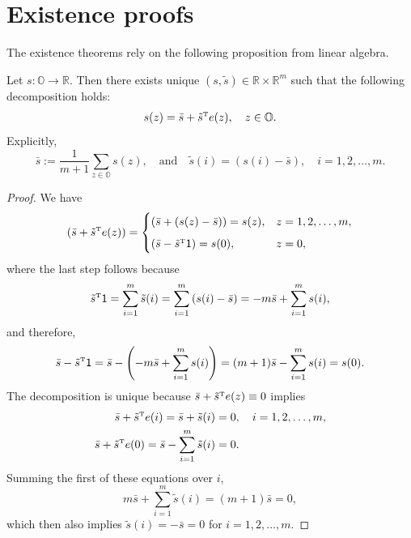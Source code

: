 \documentclass[twoside,11pt]{article}
\def\Re{\mathbb{R}}
\newcommand{\field}[1]{\mathbb{#1}}
\def\Re{\field{R}}
\def\Re{\mathbb{R}}
\renewcommand{\Re}{\mathbb{R}}
\def\bO{\mathbb{O}}
\def\ones{{\sf 1}}
\def\tp{{\hbox{\rm\tiny T}}}
\begin{document}
\appendix



\section{Existence proofs}
\label{appdx:existence}

The existence theorems rely on the following proposition from
linear algebra.

\begin{proposition}\label{prop:linear_algebra}
  Let $s:\bO\to \Re$. Then there exists unique $(s,\tilde{s}) \in \Re
  \times \Re^m$ such that the following decomposition holds:
  \begin{equation*}
  s(z) = \bar{s} +\tilde{s}^\tp e(z) ,\quad z\in\bO.
\end{equation*}
Explicitly, 
\begin{equation*}
\bar{s}:= \frac{1}{m+1} \sum_{z\in\bO} s(z),\quad \text{and} \quad 
\tilde{s} (i) = (s(i) - \bar{s}),\quad
i=1,2,\hdots,m.
\end{equation*}
\end{proposition}
\begin{proof}
  We have 
  \begin{equation*}
\left( \bar{s} +\tilde{s}^\tp e(z) \right)   = \begin{cases}
\left( \bar{s} + ( s(z) -\bar{s} )\right) = s(z) , &  z=1,2,\hdots,m,\\[5pt]
   \left( \bar{s} - \tilde{s}^\tp \ones \right) = s(0),
     & z=0,
     \end{cases}
 \end{equation*}
 where the last step follows because
 \begin{equation*}
   \tilde{s}^\tp \ones = \sum_{i=1}^m \tilde{s}(i)  = \sum_{i=1}^m
     \left(s(i) - \bar{s} \right) = - m \bar{s}  + \sum_{i=1}^m s(i),\end{equation*}
and therefore,  \begin{equation*}
\bar{s} - \tilde{s}^\tp \ones = \bar{s} - \left(- m \bar{s} +
  \sum_{i=1}^m s(i) \right) = (m+1) \bar{s} - \sum_{i=1}^m s(i) = s(0).
\end{equation*}
The decomposition is unique because $\bar{s} + \tilde{s}^\tp e(z)
\equiv 0$ implies
\begin{align*}
  \bar{s} + \tilde{s}^\tp e(i) = \bar{s} + \tilde{s}(i) &= 0, \quad i=1,2,\hdots,m, \\
  \bar{s} + \tilde{s}^\tp e(0) = \bar{s} - \sum_{i=1}^m \tilde{s}(i) &= 0.
\end{align*}
Summing the first of these equations over $i$,
\begin{equation*}
m\bar{s} + \sum_{i=1}^m \tilde{s}(i) = (m+1) \bar{s} =0,
\end{equation*}
which then also implies $\tilde{s}(i) = -\bar{s} =0$ for
$i=1,2,\hdots,m$.         
\end{proof}
\end{document}
